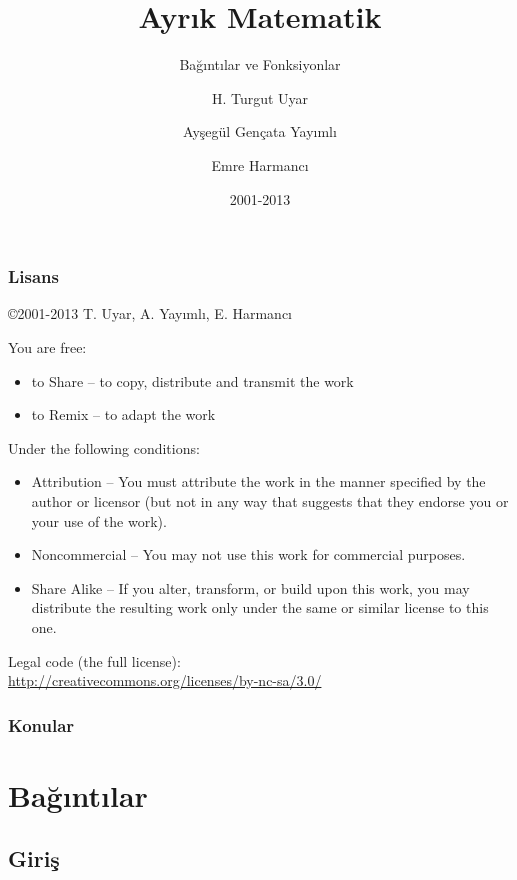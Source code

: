 \documentclass[dvipsnames]{beamer}
\title{Ayrık Matematik}
\subtitle{Bağıntılar ve Fonksiyonlar}
\author{H. Turgut Uyar \and Ayşegül Gençata Yayımlı \and Emre Harmancı}
\date{2001-2013}
\theoremstyle{definition}
\theoremstyle{example}
\theoremstyle{plain}
\begin{document}
\begin{frame}
  \titlepage
\end{frame}

\begin{frame}
  \frametitle{Lisans}

  \hfill
  \copyright 2001-2013 T. Uyar, A. Yayımlı, E. Harmancı

  \vfill
  \begin{tiny}
    You are free:
    \begin{itemize}
      \item to Share -- to copy, distribute and transmit the work
      \item to Remix -- to adapt the work
    \end{itemize}

    Under the following conditions:
    \begin{itemize}
      \item Attribution -- You must attribute the work in the manner specified by
        the author or licensor (but not in any way that suggests that they
        endorse you or your use of the work).

      \item Noncommercial -- You may not use this work for commercial purposes.

      \item Share Alike -- If you alter, transform, or build upon this work, you
        may distribute the resulting work only under the same or similar license
        to this one.
    \end{itemize}
  \end{tiny}

  \vfill
  Legal code (the full license):\\
  \url{http://creativecommons.org/licenses/by-nc-sa/3.0/}
\end{frame}

\begin{frame}
  \frametitle{Konular}
  \tableofcontents
\end{frame}

\section{Bağıntılar}

\subsection{Giriş}
\end{document}
